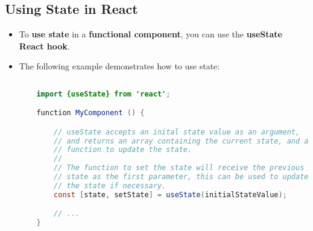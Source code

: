 \documentclass{article}
\begin{document}
    \section*{}

    \subsection*{Using State in React}
    \begin{itemize}
        \item To \textbf{use state} in a \textbf{functional component}, you can use the \textbf{useState React hook}.
        \item The following example demonstrates how to use state:
        \begin{lstlisting}[language=Java]
    
    import {useState} from 'react';

    function MyComponent () {

        // useState accepts an inital state value as an argument, 
        // and returns an array containing the current state, and a 
        // function to update the state.
        //
        // The function to set the state will receive the previous
        // state as the first parameter, this can be used to update
        // the state if necessary.
        const [state, setState] = useState(initialStateValue);

        // ...
    }
        \end{lstlisting}
    \end{itemize}
\end{document}
